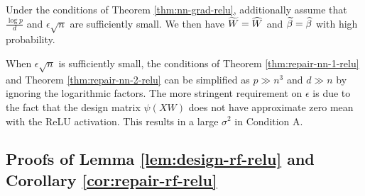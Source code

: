 \begin{thm}\label{thm:repair-nn-2-relu}
Under the conditions of Theorem \ref{thm:nn-grad-relu}, additionally assume that $\frac{\log p}{d}$ and $\epsilon\sqrt{n}$ are sufficiently small. We then have $\widetilde{W}=\widehat{W}$ and $\widetilde{\beta}=\widehat{\beta}$ with high probability.
\end{thm}

\begin{remark}
When $\epsilon\sqrt{n}$ is sufficiently small, the conditions of Theorem \ref{thm:repair-nn-1-relu} and Theorem \ref{thm:repair-nn-2-relu} can be simplified as $p \gg n^3$ and $d\gg n$ by ignoring the logarithmic factors. The more stringent requirement on $\epsilon$ is due to the fact that the design matrix $\psi(XW)$ does not have approximate zero mean with the ReLU activation. This results in a large $\sigma^2$ in Condition A.
\end{remark}


\subsection{Proofs of Lemma \ref{lem:design-rf-relu} and Corollary \ref{cor:repair-rf-relu}}

